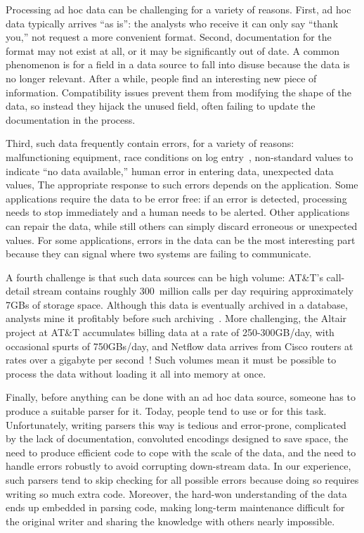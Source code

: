 \documentclass{sig-alternate}
\newcommand{\ningaui}{Altair}
\begin{document}
Processing ad hoc data can be challenging for a variety of
reasons. First, ad hoc data typically arrives ``as is'': the analysts
who receive it can only say ``thank you,'' not request a more convenient format. 
Second, documentation for the format may not exist at all, or it may be
significantly out of date.  A common phenomenon is for a field in a
data source to fall into disuse because the data is no longer
relevant.  After a while, people find an interesting new piece of
information.  Compatibility issues prevent them from modifying the
shape of the data, so instead they hijack the unused field, often
failing to update the documentation in the process.

Third, such data frequently contain errors, for a variety of
reasons: malfunctioning equipment, race conditions on log
entry~\cite{wpp}, non-standard values to indicate ``no data
available,'' human error in entering data, unexpected data
values, \etc{} The appropriate response to such errors depends on the application. Some applications require the data to be error free: 
if an error is detected, processing needs to stop immediately and a human
needs to be alerted.  Other applications can repair the data, while still
others can simply discard erroneous or unexpected values.  
For some applications,
errors in the data can be the most interesting part  because
they can signal where two systems are failing to communicate.

A fourth challenge is that such data sources can be high volume:
AT\&T's call-detail stream contains roughly 300~million calls per day
requiring approximately 7GBs of storage space. Although this data is
eventually archived in a database, analysts mine it profitably before
such archiving~\cite{kdd98,kdd99}. More challenging, the \ningaui{} project at AT\&T
accumulates billing data at a rate
of 250-300GB/day, with occasional spurts of 750GBs/day, and Netflow data
arrives from Cisco routers at rates over a gigabyte per
second~\cite{gigascope}! Such volumes mean it must be possible to
process the data without loading it all into memory at once.

Finally, before anything can be done with an ad hoc data source,
someone has to produce a suitable parser for it.
Today, people tend to use \C{} or \perl{} for this task.
Unfortunately, writing
parsers this way is tedious and error-prone, complicated by the lack
of documentation, convoluted encodings designed to save space, 
the need to produce efficient code to cope with the scale of the data,
and the need to handle errors robustly to avoid corrupting down-stream data.
In our experience, 
such parsers tend to skip checking for all possible errors
because doing so requires writing so much extra code. 
Moreover, the hard-won understanding of the data
ends up embedded in parsing code, making long-term maintenance
difficult for the original writer and sharing the knowledge with
others nearly impossible.
\end{document}
